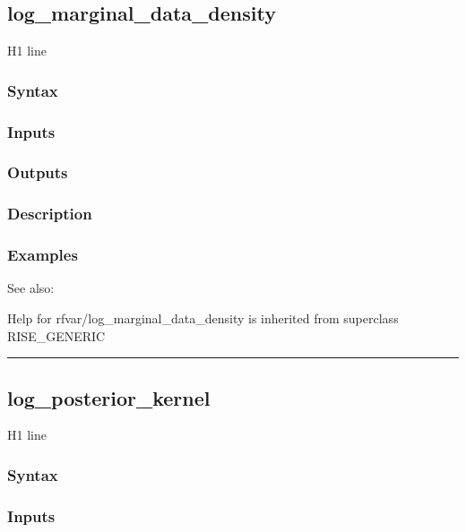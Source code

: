 \documentclass[letterpaper,10pt,english]{sphinxmanual}
\begin{document}
\subsection{log\_marginal\_data\_density}
\label{classes/models/@rfvar/rfvar:id54}\label{classes/models/@rfvar/rfvar:log-marginal-data-density}
H1 line


\subsubsection{Syntax}
\label{classes/models/@rfvar/rfvar:id55}

\subsubsection{Inputs}
\label{classes/models/@rfvar/rfvar:id56}

\subsubsection{Outputs}
\label{classes/models/@rfvar/rfvar:id57}

\subsubsection{Description}
\label{classes/models/@rfvar/rfvar:id58}

\subsubsection{Examples}
\label{classes/models/@rfvar/rfvar:id59}
See also:

Help for rfvar/log\_marginal\_data\_density is inherited from superclass RISE\_GENERIC


\bigskip\hrule{}\bigskip



\subsection{log\_posterior\_kernel}
\label{classes/models/@rfvar/rfvar:log-posterior-kernel}\label{classes/models/@rfvar/rfvar:id60}
H1 line


\subsubsection{Syntax}
\label{classes/models/@rfvar/rfvar:id61}

\subsubsection{Inputs}
\label{classes/models/@rfvar/rfvar:id62}
\end{document}
